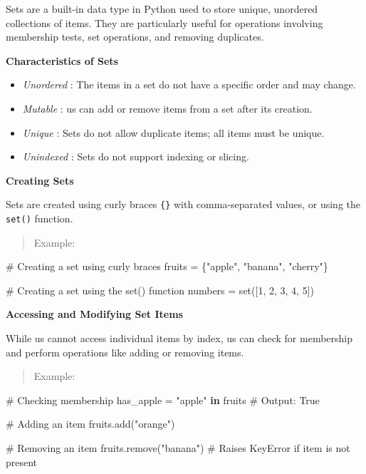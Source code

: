 \documentclass[
  letterpaper,
  DIV=11,
  numbers=noendperiod]{scrreprt}
\newenvironment{Shaded}{\begin{snugshade}}{\end{snugshade}}
\newcommand{\BuiltInTok}[1]{\textcolor[rgb]{0.00,0.23,0.31}{#1}}
\newcommand{\CommentTok}[1]{\textcolor[rgb]{0.37,0.37,0.37}{#1}}
\newcommand{\DecValTok}[1]{\textcolor[rgb]{0.68,0.00,0.00}{#1}}
\newcommand{\KeywordTok}[1]{\textcolor[rgb]{0.00,0.23,0.31}{\textbf{#1}}}
\newcommand{\NormalTok}[1]{\textcolor[rgb]{0.00,0.23,0.31}{#1}}
\newcommand{\OperatorTok}[1]{\textcolor[rgb]{0.37,0.37,0.37}{#1}}
\newcommand{\StringTok}[1]{\textcolor[rgb]{0.13,0.47,0.30}{#1}}
\providecommand{\tightlist}{%
  \setlength{\itemsep}{0pt}\setlength{\parskip}{0pt}}\usepackage{longtable,booktabs,array}
\theoremstyle{plain}
\theoremstyle{definition}
\theoremstyle{remark}
\begin{document}
Sets are a built-in data type in Python used to store unique, unordered
collections of items. They are particularly useful for operations
involving membership tests, set operations, and removing duplicates.

\textbf{Characteristics of Sets}

\begin{itemize}
\tightlist
\item
  \emph{Unordered} : The items in a set do not have a specific order and
  may change.
\item
  \emph{Mutable} : us can add or remove items from a set after its
  creation.
\item
  \emph{Unique} : Sets do not allow duplicate items; all items must be
  unique.
\item
  \emph{Unindexed} : Sets do not support indexing or slicing.
\end{itemize}

\textbf{Creating Sets}

Sets are created using curly braces \texttt{\{\}} with comma-separated
values, or using the \texttt{set()} function.

\begin{quote}
Example:
\end{quote}

\begin{Shaded}
\begin{Highlighting}[]
\CommentTok{\# Creating a set using curly braces}
\NormalTok{fruits }\OperatorTok{=}\NormalTok{ \{}\StringTok{"apple"}\NormalTok{, }\StringTok{"banana"}\NormalTok{, }\StringTok{"cherry"}\NormalTok{\}}

\CommentTok{\# Creating a set using the set() function}
\NormalTok{numbers }\OperatorTok{=} \BuiltInTok{set}\NormalTok{([}\DecValTok{1}\NormalTok{, }\DecValTok{2}\NormalTok{, }\DecValTok{3}\NormalTok{, }\DecValTok{4}\NormalTok{, }\DecValTok{5}\NormalTok{])}
\end{Highlighting}
\end{Shaded}

\textbf{Accessing and Modifying Set Items}

While us cannot access individual items by index, us can check for
membership and perform operations like adding or removing items.

\begin{quote}
Example:
\end{quote}

\begin{Shaded}
\begin{Highlighting}[]
\CommentTok{\# Checking membership}
\NormalTok{has\_apple }\OperatorTok{=} \StringTok{"apple"} \KeywordTok{in}\NormalTok{ fruits  }\CommentTok{\# Output: True}

\CommentTok{\# Adding an item}
\NormalTok{fruits.add(}\StringTok{"orange"}\NormalTok{)}

\CommentTok{\# Removing an item}
\NormalTok{fruits.remove(}\StringTok{"banana"}\NormalTok{)  }\CommentTok{\# Raises KeyError if item is not present}
\end{Highlighting}
\end{Shaded}
\end{document}
